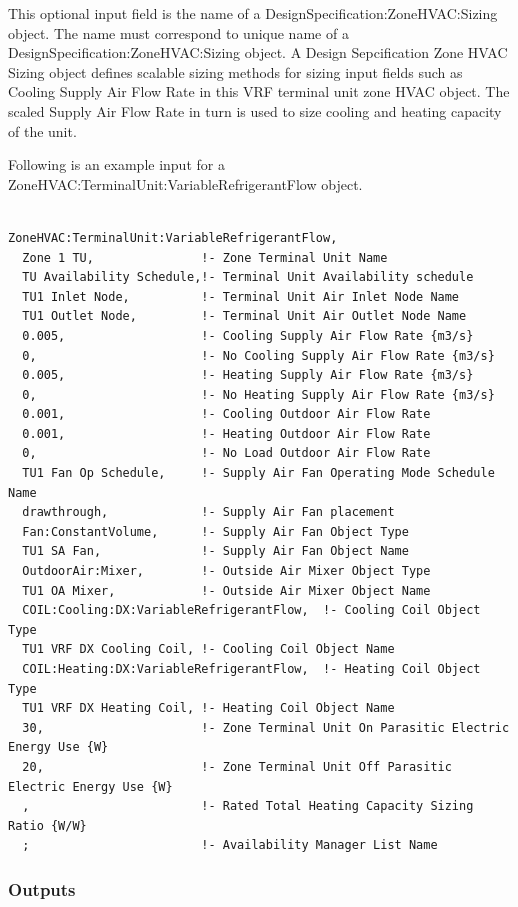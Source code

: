 This optional input field is the name of a DesignSpecification:ZoneHVAC:Sizing object. The name must correspond to unique name of a DesignSpecification:ZoneHVAC:Sizing object. A Design Sepcification Zone HVAC Sizing object defines scalable sizing methods for sizing input fields such as Cooling Supply Air Flow Rate in this VRF terminal unit zone HVAC object. The scaled Supply Air Flow Rate in turn is used to size cooling and heating capacity of the unit.

Following is an example input for a ZoneHVAC:TerminalUnit:VariableRefrigerantFlow object.

\begin{lstlisting}

ZoneHVAC:TerminalUnit:VariableRefrigerantFlow,
  Zone 1 TU,               !- Zone Terminal Unit Name
  TU Availability Schedule,!- Terminal Unit Availability schedule
  TU1 Inlet Node,          !- Terminal Unit Air Inlet Node Name
  TU1 Outlet Node,         !- Terminal Unit Air Outlet Node Name
  0.005,                   !- Cooling Supply Air Flow Rate {m3/s}
  0,                       !- No Cooling Supply Air Flow Rate {m3/s}
  0.005,                   !- Heating Supply Air Flow Rate {m3/s}
  0,                       !- No Heating Supply Air Flow Rate {m3/s}
  0.001,                   !- Cooling Outdoor Air Flow Rate
  0.001,                   !- Heating Outdoor Air Flow Rate
  0,                       !- No Load Outdoor Air Flow Rate
  TU1 Fan Op Schedule,     !- Supply Air Fan Operating Mode Schedule Name
  drawthrough,             !- Supply Air Fan placement
  Fan:ConstantVolume,      !- Supply Air Fan Object Type
  TU1 SA Fan,              !- Supply Air Fan Object Name
  OutdoorAir:Mixer,        !- Outside Air Mixer Object Type
  TU1 OA Mixer,            !- Outside Air Mixer Object Name
  COIL:Cooling:DX:VariableRefrigerantFlow,  !- Cooling Coil Object Type
  TU1 VRF DX Cooling Coil, !- Cooling Coil Object Name
  COIL:Heating:DX:VariableRefrigerantFlow,  !- Heating Coil Object Type
  TU1 VRF DX Heating Coil, !- Heating Coil Object Name
  30,                      !- Zone Terminal Unit On Parasitic Electric Energy Use {W}
  20,                      !- Zone Terminal Unit Off Parasitic Electric Energy Use {W}
  ,                        !- Rated Total Heating Capacity Sizing Ratio {W/W}
  ;                        !- Availability Manager List Name
\end{lstlisting}

\subsubsection{Outputs}\label{outputs-12-006}

